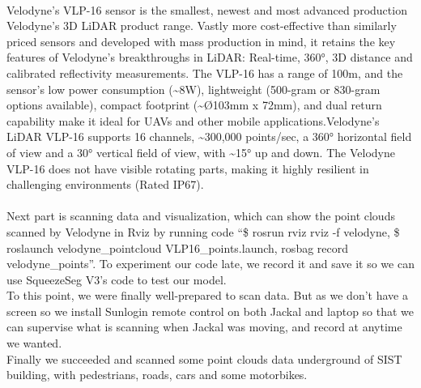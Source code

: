 \documentclass{article}
\begin{document}
\begin{normalsize}
         ~\\
         Velodyne’s VLP-16 sensor is the smallest, newest and most advanced production Velodyne’s 3D LiDAR product range. Vastly more cost-effective than similarly priced sensors and developed with mass production in mind, it retains the key features of Velodyne’s breakthroughs in LiDAR: Real-time, 360°, 3D distance and calibrated reflectivity measurements. The VLP-16 has a range of 100m, and the sensor’s low power consumption (\~{}8W), lightweight (500-gram or 830-gram options available), compact footprint (\~{}Ø103mm x 72mm), and dual return capability make it ideal for UAVs and other mobile applications.Velodyne’s LiDAR VLP-16 supports 16 channels, \~{}300,000 points/sec, a 360° horizontal field of view and a 30° vertical field of view, with \~{}15° up and down. The Velodyne VLP-16 does not have visible rotating parts, making it highly resilient in challenging environments (Rated IP67). \\
         ~\\
         Next part is scanning data and visualization, which can show the point clouds scanned by Velodyne in Rviz by running code “\$ rosrun rviz rviz -f velodyne, \$ roslaunch velodyne\_pointcloud VLP16\_points.launch, rosbag record velodyne\_points”. To experiment our code late, we record it and save it so we can use SqueezeSeg V3’s code to test our model.\\
         To this point, we were finally well-prepared to scan data. But as we don’t have a screen so we install Sunlogin remote control on both Jackal and laptop so that we can supervise what is scanning when Jackal was moving, and record at anytime we wanted.\\
         Finally we succeeded and scanned some point clouds data underground of SIST building, with pedestrians, roads, cars and some motorbikes.
                 


\end{normalsize}
\end{document}
